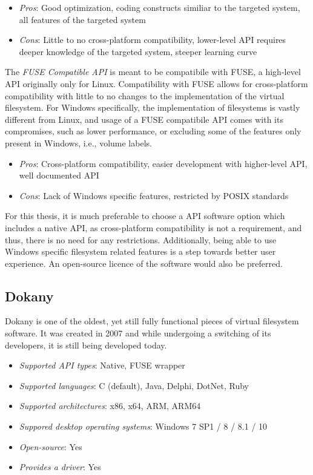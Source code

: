 \begin{itemize}
    \item \textit{Pros}: Good optimization, coding constructs similiar to the targeted system, all features of the targeted system
    \item \textit{Cons}: Little to no cross-platform compatibility, lower-level API requires deeper knowledge of the targeted system, steeper learning curve
\end{itemize}

The \textit{FUSE Compatible API} is meant to be compatibile with FUSE, a high-level API originally only for Linux. Compatibility with FUSE allows for cross-platform compatibility with little to no changes to the implementation of the virtual filesystem. For Windows specifically, the implementation of filesystems is vastly different from Linux, and usage of a FUSE compatibile API comes with its compromises, such as lower performance, or excluding some of the features only present in Windows, i.e., volume labels.\cite{WinFspVSFUSE}\cite{FUSE}

\begin{itemize}
    \item \textit{Pros}: Cross-platform compatibility, easier development with higher-level API, well documented API
    \item \textit{Cons}: Lack of Windows specific features, restricted by POSIX standards
\end{itemize}

For this thesis, it is much preferable to choose a API software option which includes a native API, as cross-platform compatibility is not a requirement, and thus, there is no need for any restrictions. Additionally, being able to use Windows specific filesystem related features is a step towards better user experience. An open-source licence of the software would also be preferred.

\subsection*{Dokany}
Dokany is one of the oldest, yet still fully functional pieces of virtual filesystem software. It was created in 2007 and while undergoing a switching of its developers, it is still being developed today.

\begin{itemize}
    \item \textit{Supported API types}: Native, FUSE wrapper
    \item \textit{Supported languages}: C (default), Java, Delphi, DotNet, Ruby
    \item \textit{Supported architectures}: x86, x64, ARM, ARM64
    \item \textit{Suppored desktop operating systems}: Windows 7 SP1 / 8 / 8.1 / 10
    \item \textit{Open-source}: Yes
    \item \textit{Provides a driver}: Yes
\end{itemize}

